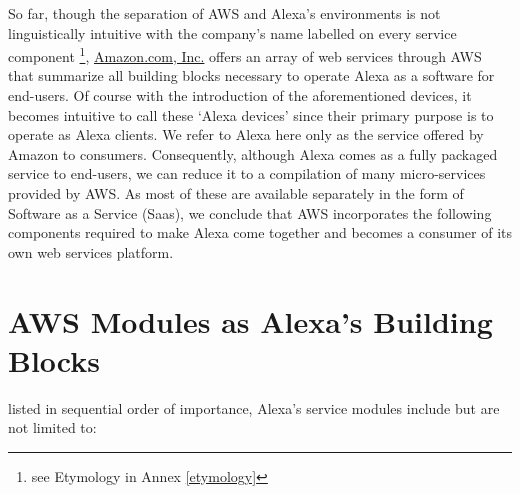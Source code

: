 So far, though the separation of AWS and Alexa's environments is not linguistically intuitive with the company's name labelled on every service component \footnote{see Etymology in Annex \ref{etymology}}, \href{http://www.amazon.com}{Amazon.com, Inc.} offers an array of web services through AWS that summarize all building blocks necessary to operate Alexa as a software for end-users. Of course with the introduction of the aforementioned devices, it becomes intuitive to call these `Alexa devices' since their primary purpose is to operate as Alexa clients. We refer to Alexa here only as the service offered by Amazon to consumers. Consequently, although Alexa comes as a fully packaged service to end-users, we can reduce it to a compilation of many micro-services provided by AWS. As most of these are available separately in the form of Software as a Service (Saas), we conclude that AWS incorporates the following components required to make Alexa come together and becomes a consumer of its own web services platform. 


\section{AWS Modules as Alexa's Building Blocks }

listed in sequential order of importance, Alexa's service modules include but are not limited to: 

